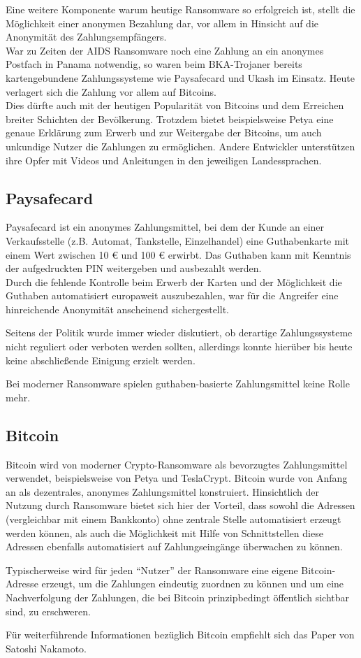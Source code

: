 Eine weitere Komponente warum heutige Ransomware so erfolgreich ist, stellt die Möglichkeit einer anonymen Bezahlung dar, vor allem in Hinsicht auf die Anonymität des Zahlungsempfängers. \\
War zu Zeiten der AIDS Ransomware noch eine Zahlung an ein anonymes Postfach in Panama notwendig, so waren beim BKA-Trojaner bereits kartengebundene Zahlungssysteme wie Paysafecard und Ukash im Einsatz. Heute verlagert sich die Zahlung vor allem auf Bitcoins. \\
Dies dürfte auch mit der heutigen Popularität von Bitcoins und dem Erreichen breiter Schichten der Bevölkerung. Trotzdem bietet beispielsweise Petya eine genaue Erklärung zum Erwerb und zur Weitergabe der Bitcoins, um auch unkundige Nutzer die Zahlungen zu ermöglichen. \cite{petya:infect} Andere Entwickler unterstützen ihre Opfer mit Videos und Anleitungen in den jeweiligen Landessprachen.

\subsection{Paysafecard}
Paysafecard ist ein anonymes Zahlungsmittel, bei dem der Kunde an einer Verkaufsstelle (z.B. Automat, Tankstelle, Einzelhandel) eine Guthabenkarte mit einem Wert zwischen 10 € und 100 € erwirbt. Das Guthaben kann mit Kenntnis der aufgedruckten PIN weitergeben und ausbezahlt werden. \\
Durch die fehlende Kontrolle beim Erwerb der Karten und der Möglichkeit die Guthaben automatisiert europaweit auszubezahlen, war für die Angreifer eine hinreichende Anonymität anscheinend sichergestellt. 

Seitens der Politik wurde immer wieder diskutiert, ob derartige Zahlungssysteme nicht reguliert oder verboten werden sollten, allerdings konnte hierüber bis heute keine abschließende Einigung erzielt werden. \cite{paysafecard}

Bei moderner Ransomware spielen guthaben-basierte Zahlungsmittel keine Rolle mehr.

\subsection{Bitcoin}
Bitcoin wird von moderner Crypto-Ransomware als bevorzugtes Zahlungsmittel verwendet, beispielsweise von Petya und TeslaCrypt. Bitcoin wurde von Anfang an als dezentrales, anonymes Zahlungsmittel konstruiert. Hinsichtlich der Nutzung durch Ransomware bietet sich hier der Vorteil, dass sowohl die Adressen (vergleichbar mit einem Bankkonto) ohne zentrale Stelle automatisiert erzeugt werden können, als auch die Möglichkeit mit Hilfe von Schnittstellen diese Adressen ebenfalls automatisiert auf Zahlungseingänge überwachen zu können. 

Typischerweise wird für jeden "`Nutzer"' der Ransomware eine eigene Bitcoin-Adresse erzeugt, um die Zahlungen eindeutig zuordnen zu können und um eine Nachverfolgung der Zahlungen, die bei Bitcoin prinzipbedingt öffentlich sichtbar sind, zu erschweren. 

Für weiterführende Informationen bezüglich Bitcoin empfiehlt sich das Paper von Satoshi Nakamoto. \cite{bitcoin}
